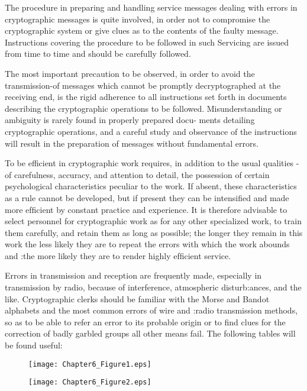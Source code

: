 \mypara The procedure in preparing and handling service messages dealing
with errors in cryptographic messages is quite involved, in order not to
compromise the cryptographic system or give clues as to the contents of
the faulty message. Instructions covering the procedure to be followed
in such Servicing are issued from time to time and should be carefully
followed.

\mypara The most important precaution to be observed, in order to avoid the
transmission-of messages which cannot be promptly decryptographed at
the receiving end, is the rigid adherence to all instructions set forth in
documents describing the cryptographic operations to be followed. Misunderstanding or ambiguity is rarely found in properly prepared docu-
ments detailing cryptographic operations, and a careful study and
observance of the instructions will result in the preparation of messages
without fundamental errors.

\mypara To be efficient in cryptographic work requires, in addition to the
usual qualities -of carefulness, accuracy, and attention to detail, the
possession of certain psychological characteristics peculiar to the work. If
absent, these characteristics as a rule cannot be developed, but if present
they can be intensiﬁed and made more efﬁcient by constant practice and
experience. It is therefore advisable to select personnel for cryptographic
work as for any other specialized work, to train them carefully, and
retain them as long as possible; the longer they remain in this work the
less likely they are to repeat the errors with which the work abounds and
:the more likely they are to render highly efﬁcient service.

\mypara Errors in transmission and reception are frequently made, especially
in transmission by radio, because of interference, atmospheric disturb:ances, and the like. Cryptographic clerks should be familiar with the
Morse and Bandot alphabets and the most common errors of wire and
:radio transmission methods, so as to be able to refer an error to its
probable origin or to ﬁnd clues for the correction of badly garbled groups
\when all other means fail. The following tables will be found useful:

\begin{figure}[h]
   \centering
    \texttt{[image: Chapter6\_Figure1.eps]}
\end{figure}


\begin{figure}[h]
   \centering
    \texttt{[image: Chapter6\_Figure2.eps]}
\end{figure}

